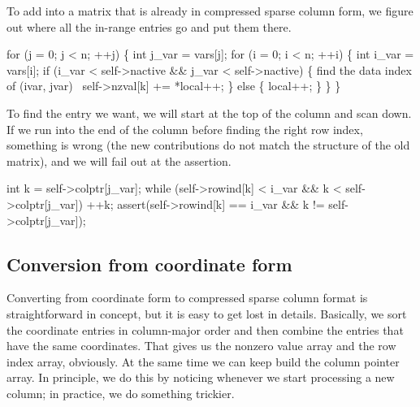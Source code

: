 To add into a matrix that is already in compressed sparse column form,
we figure out where all the in-range entries go and put them there.

\nwenddocs{}\endmoddef
for (j = 0; j < n; ++j) \{
    int j_var = vars[j];
    for (i = 0; i < n; ++i) \{
        int i_var = vars[i];
        if (i_var < self->nactive && j_var < self->nactive) \{
            \LA{}find the data index of (\code{}i{}var\edoc{}, \code{}j{}var\edoc{})~{\nwtagstyle{}}\RA{}
            self->nzval[k] += *local++;
        \} else \{
            local++;
        \}
    \}
\}
\nwendcode{}\nwdocspar

To find the entry we want, we will start at the top of the column and
scan down.  If we run into the end of the column before finding the
right row index, something is wrong (the new contributions do not
match the structure of the old matrix), and we will fail out at the
assertion.

\nwenddocs{}\endmoddef
int k = self->colptr[j_var];
while (self->rowind[k] < i_var && k < self->colptr[j_var])
     ++k;
assert(self->rowind[k] == i_var && k != self->colptr[j_var]);
\nwendcode{}\nwdocspar


\subsection{Conversion from coordinate form}

Converting from coordinate form to compressed sparse column format
is straightforward in concept, but it is easy to get lost in details.
Basically, we sort the coordinate entries in column-major order
and then combine the entries that have the same coordinates.
That gives us the nonzero value array and the row index array,
obviously.  At the same time we can keep build the column pointer
array.  In principle, we do this by noticing whenever we start
processing a new column; in practice, we do something trickier.

